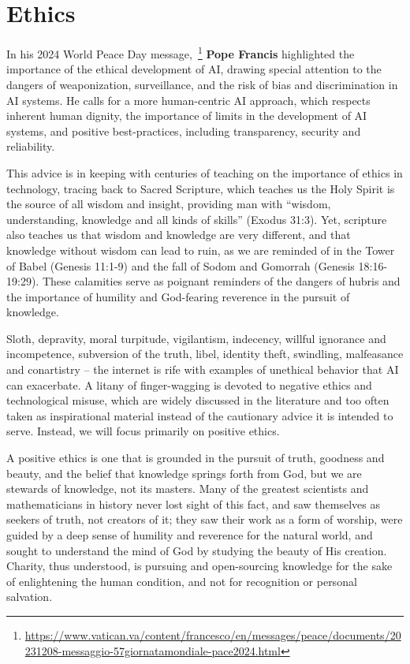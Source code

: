 \documentclass[sigplan,nonacm]{acmart}\settopmatter{printfolios=false,printccs=false,printacmref=false}
\begin{document}
  \section{Ethics}

  In his 2024 World Peace Day message,~\footnote{\url{https://www.vatican.va/content/francesco/en/messages/peace/documents/20231208-messaggio-57giornatamondiale-pace2024.html}} \textbf{Pope Francis} highlighted the importance of the ethical development of AI, drawing special attention to the dangers of weaponization, surveillance, and the risk of bias and discrimination in AI systems. He calls for a more human-centric AI approach, which respects inherent human dignity, the importance of limits in the development of AI systems, and positive best-practices, including transparency, security and reliability.

  This advice is in keeping with centuries of teaching on the importance of ethics in technology, tracing back to Sacred Scripture, which teaches us the Holy Spirit is the source of all wisdom and insight, providing man with ``wisdom, understanding, knowledge and all kinds of skills'' (Exodus 31:3). Yet, scripture also teaches us that wisdom and knowledge are very different, and that knowledge without wisdom can lead to ruin, as we are reminded of in the Tower of Babel (Genesis 11:1-9) and the fall of Sodom and Gomorrah (Genesis 18:16-19:29). These calamities serve as poignant reminders of the dangers of hubris and the importance of humility and God-fearing reverence in the pursuit of knowledge.

  Sloth, depravity, moral turpitude, vigilantism, indecency, willful ignorance and incompetence, subversion of the truth, libel, identity theft, swindling, malfeasance and conartistry -- the internet is rife with examples of unethical behavior that AI can exacerbate. A litany of finger-wagging is devoted to negative ethics and technological misuse, which are widely discussed in the literature and too often taken as inspirational material instead of the cautionary advice it is intended to serve. Instead, we will focus primarily on positive ethics.

  A positive ethics is one that is grounded in the pursuit of truth, goodness and beauty, and the belief that knowledge springs forth from God, but we are stewards of knowledge, not its masters. Many of the greatest scientists and mathematicians in history never lost sight of this fact, and saw themselves as seekers of truth, not creators of it; they saw their work as a form of worship, were guided by a deep sense of humility and reverence for the natural world, and sought to understand the mind of God by studying the beauty of His creation. Charity, thus understood, is pursuing and open-sourcing knowledge for the sake of enlightening the human condition, and not for recognition or personal salvation.
\end{document}
